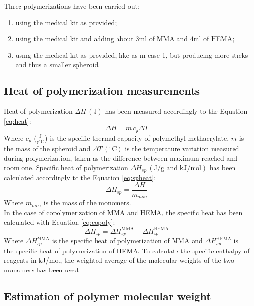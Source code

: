 \documentclass[a4paper, 11pt]{article}
\begin{document}
Three polymerizations have been carried out: 
\begin{enumerate}
\item using the medical kit as provided;
\item using the medical kit and adding about $3 \text{ml}$ of MMA and $4 \text{ml}$ of HEMA;
\item using the medical kit as provided, like as in case 1, but producing more sticks and thus a smaller spheroid.
\end{enumerate}

\subsection{Heat of polymerization measurements}

Heat of polymerization $\Delta H \,(\text{J})$ has been measured accordingly to the Equation \ref{eq:heat}:
\begin{equation}
\Delta H = m \,c_p \Delta T
\label{eq:heat} 
\end{equation}
Where $c_p$ ($\frac{\text{J}}{\text{g}^\circ\text{C}}$) is the specific thermal capacity of polymethyl methacrylate, $m$ is the mass of the spheroid and $\Delta T\,(^\circ\text{C})$ is the temperature variation measured during polymerization, taken as the difference between maximum reached and room one. Specific heat of polymerization $\Delta H_{sp}\,(\text{J}/\text{g} \,\, \text{and} \,\, \text{kJ}/\text{mol})$ has been calculated accordingly to the Equation \ref{eq:spheat}:
\begin{equation}
\Delta H_{sp} = \frac{\Delta H}{m_{mon}}
\label{eq:spheat} 
\end{equation}
Where $m_{mon}$ is the mass of the monomers. \\
In the case of copolymerization of MMA and HEMA, the specific heat has been calculated with Equation \ref{eq:copoly}:
\begin{equation}
\Delta H_{sp} = \Delta H_{sp}^\text{MMA} + \Delta H_{sp}^\text{HEMA}
\label{eq:copoly} 
\end{equation}
Where $\Delta H_{sp}^\text{MMA}$ is the specific heat of polymerization of MMA and $\Delta H_{sp}^\text{HEMA}$ is the specific heat of polymerization of HEMA. To calculate the specific enthalpy of reagents in kJ/mol, the weighted average of the molecular weights of the two monomers has been used.

\subsection{Estimation of polymer molecular weight}
\end{document}
